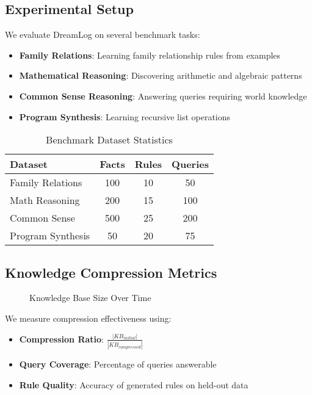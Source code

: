 \documentclass[10pt,conference]{IEEEtran}
\begin{document}

\subsection{Experimental Setup}

We evaluate DreamLog on several benchmark tasks:
\begin{itemize}
\item \textbf{Family Relations}: Learning family relationship rules from examples
\item \textbf{Mathematical Reasoning}: Discovering arithmetic and algebraic patterns
\item \textbf{Common Sense Reasoning}: Answering queries requiring world knowledge
\item \textbf{Program Synthesis}: Learning recursive list operations
\end{itemize}

\begin{table}[h]
\centering
\caption{Benchmark Dataset Statistics}
\label{tab:datasets}
\begin{tabular}{|l|c|c|c|}
\hline
Dataset & Facts & Rules & Queries \\
\hline
Family Relations & 100 & 10 & 50 \\
Math Reasoning & 200 & 15 & 100 \\
Common Sense & 500 & 25 & 200 \\
Program Synthesis & 50 & 20 & 75 \\
\hline
\end{tabular}
\end{table}

\subsection{Knowledge Compression Metrics}

\begin{figure}[h]
\centering
{}
\caption{Knowledge Base Size Over Time}
\label{fig:compression}
\end{figure}

We measure compression effectiveness using:
\begin{itemize}
\item \textbf{Compression Ratio}: $\frac{|KB_{initial}|}{|KB_{compressed}|}$
\item \textbf{Query Coverage}: Percentage of queries answerable
\item \textbf{Rule Quality}: Accuracy of generated rules on held-out data
\end{itemize}
\end{document}
